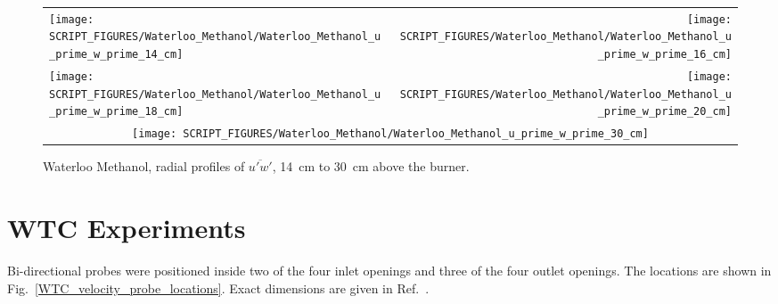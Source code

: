 \begin{figure}[p]
\begin{tabular*}{\textwidth}{l@{\extracolsep{\fill}}r}
\texttt{[image: SCRIPT\_FIGURES/Waterloo\_Methanol/Waterloo\_Methanol\_u\_prime\_w\_prime\_14\_cm]} &
\texttt{[image: SCRIPT\_FIGURES/Waterloo\_Methanol/Waterloo\_Methanol\_u\_prime\_w\_prime\_16\_cm]} \\
\texttt{[image: SCRIPT\_FIGURES/Waterloo\_Methanol/Waterloo\_Methanol\_u\_prime\_w\_prime\_18\_cm]} &
\texttt{[image: SCRIPT\_FIGURES/Waterloo\_Methanol/Waterloo\_Methanol\_u\_prime\_w\_prime\_20\_cm]} \\
\multicolumn{2}{c}{\texttt{[image: SCRIPT\_FIGURES/Waterloo\_Methanol/Waterloo\_Methanol\_u\_prime\_w\_prime\_30\_cm]}}
\end{tabular*}
\caption[Waterloo Methanol, radial profiles of $\overline{u'w'}$, 14~cm to 30~cm above the burner]
{Waterloo Methanol, radial profiles of $\overline{u'w'}$, 14~cm to 30~cm above the burner.}
\label{Water_Methanol_upwp_2}
\end{figure}

\clearpage


\section{WTC Experiments}

Bi-directional probes were positioned inside two of the four inlet openings and three of the four outlet openings. The locations are shown in Fig.~\ref{WTC_velocity_probe_locations}. Exact dimensions are given in Ref.~\cite{NIST_NCSTAR_1-5B}.

